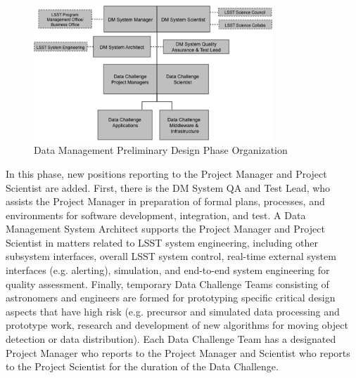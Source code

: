 \begin{figure}[htbp]
\begin{center}
 \includegraphics[width=0.8\textwidth]{images/pdphase}
\caption{ Data Management Preliminary Design Phase Organization\label{fig:pdphase}}
\end{center}
\end{figure}


In this phase, new positions reporting to the Project Manager and Project Scientist are added.  First, there is the DM System QA and Test Lead, who assists the Project Manager in preparation of formal plans, processes, and environments for software development, integration, and test. 
A Data Management System Architect supports the Project Manager and Project Scientist in matters related to LSST system engineering, including other subsystem interfaces, overall LSST system control, real-time external system interfaces (e.g. alerting), simulation, and end-to-end system engineering for quality assessment.
Finally, temporary Data Challenge Teams consisting of astronomers and engineers are formed for prototyping specific critical design aspects that have high risk (e.g. precursor and simulated data processing and prototype work, research and development of new algorithms for moving object detection or data distribution).  Each Data Challenge Team has a designated Project Manager who reports to the Project Manager and Scientist who reports to the Project Scientist for the duration of the Data Challenge.


